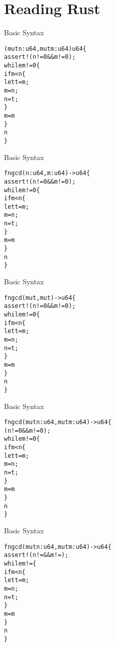 \section{Reading Rust}


\begin{frame}[fragile]{Basic Syntax}
\begin{alltt}
(mut n: u64, mut m: u64) \hi{->} u64 \{
    assert!(n != 0 && m != 0);
    while m != 0 \{
        if m < n \{
            let t = m;
            m = n;
            n = t;
        \}
        m = m % n;
    \}
    n
\}
\end{alltt}
\end{frame}


\begin{frame}[fragile]{Basic Syntax}
\begin{alltt}
fn gcd( n: u64,  m: u64) -> u64 \{
    assert!(n != 0 && m != 0);
    while m != 0 \{
        if m < n \{
            let t = m;
            m = n;
            n = t;
        \}
        m = m % n;
    \}
    n
\}
\end{alltt}
\end{frame}


\begin{frame}[fragile]{Basic Syntax}
\begin{alltt}
fn gcd(mut , mut ) -> u64 \{
    assert!(n != 0 && m != 0);
    while m != 0 \{
        if m < n \{
            let t = m;
            m = n;
            n = t;
        \}
        m = m % n;
    \}
    n
\}
\end{alltt}
\end{frame}


\begin{frame}[fragile]{Basic Syntax}
\begin{alltt}
fn gcd(mut n: u64, mut m: u64) -> u64 \{
    (n != 0 && m != 0);
    while m != 0 \{
        if m < n \{
            let t = m;
            m = n;
            n = t;
        \}
        m = m % n;
    \}
    n
\}
\end{alltt}
\end{frame}


\begin{frame}[fragile]{Basic Syntax}
\begin{alltt}
fn gcd(mut n: u64, mut m: u64) -> u64 \{
    assert!(n !=  && m != );
    while m !=  \{
        if m < n \{
            let t = m;
            m = n;
            n = t;
        \}
        m = m % n;
    \}
    n
\}
\end{alltt}
\end{frame}

